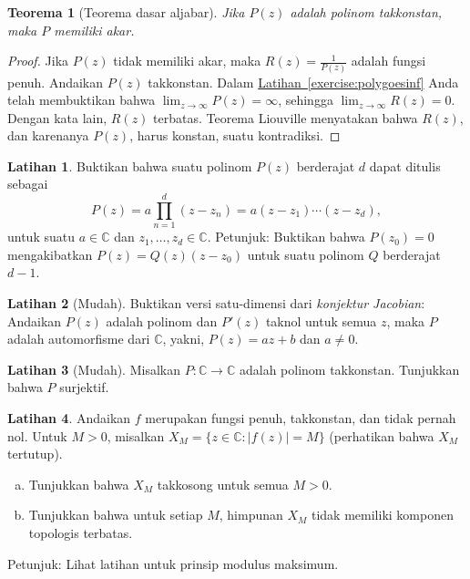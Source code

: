 \documentclass[12pt,openany]{book}
\newcommand{\sabs}[1]{\lvert {#1} \rvert}
\newcommand{\C}{{\mathbb{C}}}
\newcommand{\myindex}[1]{#1\index{#1}}
\theoremstyle{plain}
\newtheorem{thm}{Teorema}[section]
\theoremstyle{remark}
\theoremstyle{definition}
\newenvironment{exbox}{%
    \def\FrameCommand{\vrule width 1pt \relax\hspace{10pt}}%
    \MakeFramed{\advance\hsize-\width\FrameRestore}%
}{%
    \endMakeFramed
}
\newenvironment{exparts}{%
    \leavevmode\begin{enumerate}[a),noitemsep,topsep=0pt,parsep=0pt,partopsep=0pt]
}{%
    \end{enumerate}
}
\theoremstyle{exercise}
\newtheorem{exercise}{Latihan}[section]
\theoremstyle{example}
\newcommand{\exerciseref}[1]{\hyperref[#1]{Latihan~\ref*{#1}}}
\begin{document}
\begin{thm}[Teorema dasar aljabar]
Jika $P(z)$ adalah polinom takkonstan, maka $P$ memiliki akar.
\end{thm}

\begin{proof}
Jika $P(z)$ tidak memiliki akar, maka $R(z) = \frac{1}{P(z)}$ adalah
fungsi penuh.
Andaikan $P(z)$ takkonstan.
Dalam \exerciseref{exercise:polygoesinf} Anda telah membuktikan bahwa
$\lim_{z \to \infty} P(z) = \infty$, sehingga
$\lim_{z \to \infty} R(z) = 0$.  Dengan kata lain, $R(z)$ terbatas.
Teorema Liouville menyatakan bahwa $R(z)$, dan karenanya $P(z)$, harus konstan, suatu
kontradiksi.
\end{proof}

\begin{exbox}
\begin{exercise}
Buktikan bahwa suatu polinom $P(z)$ berderajat $d$ dapat ditulis sebagai
\begin{equation*}
P(z) = a \prod_{n=1}^d (z-z_n) = a (z-z_1) \cdots (z-z_d),
\end{equation*}
untuk suatu $a \in \C$ dan $z_1,\ldots,z_d \in \C$.
Petunjuk: Buktikan bahwa $P(z_0) = 0$ mengakibatkan $P(z) = Q(z) (z-z_0)$ untuk suatu
polinom $Q$ berderajat $d-1$.
\end{exercise}

\begin{exercise}[Mudah]
Buktikan versi satu-dimensi dari \emph{\myindex{konjektur Jacobian}}:
Andaikan $P(z)$ adalah polinom dan $P'(z)$ taknol untuk semua $z$,
maka $P$ adalah automorfisme dari $\C$, yakni, $P(z) = az+b$ dan $a \neq 0$.
\end{exercise}

\begin{exercise}[Mudah]
Misalkan $P \colon \C \to \C$ adalah polinom takkonstan.  Tunjukkan bahwa $P$
surjektif.
\end{exercise}

\begin{exercise}
Andaikan $f$ merupakan fungsi penuh, takkonstan, dan tidak pernah nol.  Untuk $M > 0$, misalkan
$X_M = \bigl\{ z \in \C : \sabs{f(z)} = M \bigr\}$ (perhatikan bahwa $X_M$
tertutup).
\begin{exparts}
\item Tunjukkan bahwa $X_M$ takkosong untuk semua $M > 0$.
\item Tunjukkan bahwa untuk setiap $M$, himpunan $X_M$ tidak memiliki komponen topologis terbatas.
\end{exparts}
Petunjuk: Lihat latihan untuk prinsip modulus maksimum.
\end{exercise}
\end{exbox}
\end{document}
